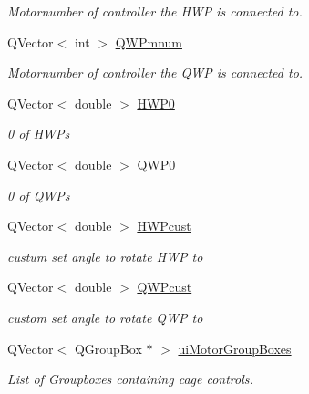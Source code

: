 \begin{DoxyCompactItemize}
\begin{DoxyCompactList}\small\item\em Motornumber of controller the H\+WP is connected to. \end{DoxyCompactList}\item 
\mbox{\label{classcagecontrol_a0ecfc817dfe853a073e6b11b3ac9c53c}} 
Q\+Vector$<$ int $>$ \hyperlink{classcagecontrol_a0ecfc817dfe853a073e6b11b3ac9c53c}{Q\+W\+Pmnum}
\begin{DoxyCompactList}\small\item\em Motornumber of controller the Q\+WP is connected to. \end{DoxyCompactList}\item 
\mbox{\label{classcagecontrol_a89582491b0b4f2421abe2e7cad735505}} 
Q\+Vector$<$ double $>$ \hyperlink{classcagecontrol_a89582491b0b4f2421abe2e7cad735505}{H\+W\+P0}
\begin{DoxyCompactList}\small\item\em \textquotesingle{}0\textquotesingle{} of H\+W\+Ps \end{DoxyCompactList}\item 
\mbox{\label{classcagecontrol_a6f1fca7829c5e2c25e6a15969aa9a622}} 
Q\+Vector$<$ double $>$ \hyperlink{classcagecontrol_a6f1fca7829c5e2c25e6a15969aa9a622}{Q\+W\+P0}
\begin{DoxyCompactList}\small\item\em \textquotesingle{}0\textquotesingle{} of Q\+W\+Ps \end{DoxyCompactList}\item 
\mbox{\label{classcagecontrol_a1502c9ebc5e04d61af76492d563f9e0e}} 
Q\+Vector$<$ double $>$ \hyperlink{classcagecontrol_a1502c9ebc5e04d61af76492d563f9e0e}{H\+W\+Pcust}
\begin{DoxyCompactList}\small\item\em custum set angle to rotate H\+WP to \end{DoxyCompactList}\item 
\mbox{\label{classcagecontrol_a43e35156274c70bda842d25680a9159d}} 
Q\+Vector$<$ double $>$ \hyperlink{classcagecontrol_a43e35156274c70bda842d25680a9159d}{Q\+W\+Pcust}
\begin{DoxyCompactList}\small\item\em custom set angle to rotate Q\+WP to \end{DoxyCompactList}\item 
\mbox{\label{classcagecontrol_aced71e7c8e0053e6d4291bcee17c9af7}} 
Q\+Vector$<$ Q\+Group\+Box $\ast$ $>$ \hyperlink{classcagecontrol_aced71e7c8e0053e6d4291bcee17c9af7}{ui\+Motor\+Group\+Boxes}
\begin{DoxyCompactList}\small\item\em List of Groupboxes containing cage controls. \end{DoxyCompactList}\end{DoxyCompactItemize}


